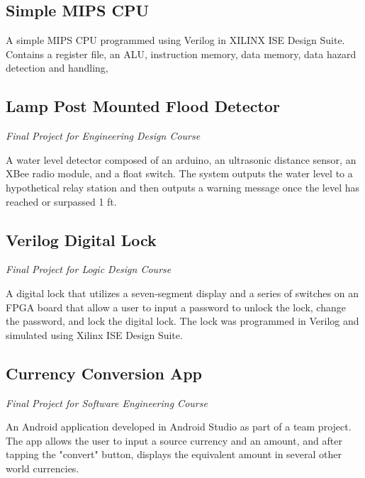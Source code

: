 \documentclass{article}
\begin{document}
\subsection{Simple MIPS CPU} 

A simple MIPS CPU programmed using Verilog in XILINX ISE Design Suite. Contains a register file, an ALU, instruction memory, data memory, data hazard detection and handling, 
\vspace{-.75em}
\subsection{Lamp Post Mounted Flood Detector} \textit{Final Project for Engineering Design Course}

A water level detector composed of an arduino, an ultrasonic distance sensor, an XBee radio module, and a float switch. The system outputs the water level to a hypothetical relay station and then outputs a warning message once the level has reached or surpassed 1 ft.
\vspace{-.75em}
\subsection{Verilog Digital Lock} \textit{Final Project for Logic Design Course}

A digital lock that utilizes a seven-segment display and a series of switches on an FPGA board that allow a user to input a password to unlock the lock, change the password, and lock the digital lock. The lock was programmed in Verilog and simulated using Xilinx ISE Design Suite.
\vspace{-.75em}
\subsection{Currency Conversion App} \textit{Final Project for Software Engineering Course}

An Android application developed in Android Studio as part of a team project. The app allows the user to input a source currency and an amount, and after tapping the "convert" button, displays the equivalent amount in several other world currencies.
\end{document}
